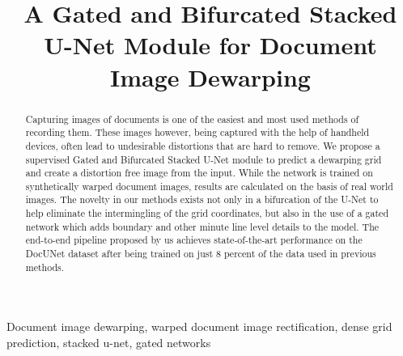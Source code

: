 \documentclass[a4paper,conference]{IEEEtran}
\begin{document}
	\title{A Gated and Bifurcated Stacked U-Net Module for Document Image Dewarping}
	
	\author{
		
		\and 
		
	}
	
	
	\maketitle
	
	\begin{abstract}
		Capturing images of documents is one of the easiest and most used methods of recording them. These images however, being captured with the help of handheld devices, often lead to undesirable distortions that are hard to remove. We propose a supervised Gated and Bifurcated Stacked U-Net module to predict a dewarping grid and create a distortion free image from the input. While the network is trained on synthetically warped document images, results are calculated on the basis of real world images. The novelty in our methods exists not only in a bifurcation of the U-Net to help eliminate the intermingling of the grid coordinates, but also in the use of a gated network which adds boundary and other minute line level details to the model. The end-to-end pipeline proposed by us achieves state-of-the-art performance on the DocUNet dataset after being trained on just 8 percent of the data used in previous methods.\\
	\end{abstract}
	
	\begin{IEEEkeywords}
		Document image dewarping, warped document image rectification, dense grid prediction, stacked u-net, gated networks
	\end{IEEEkeywords}
	
\end{document}
